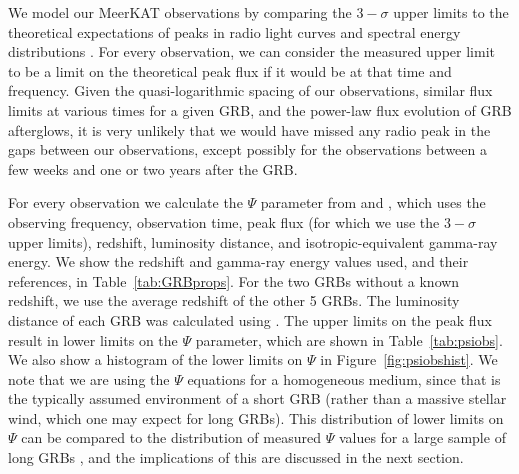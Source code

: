 \documentclass[12pt]{article}
\begin{document}
We model our MeerKAT observations by comparing the $3-\sigma$ upper limits to the theoretical expectations of peaks in radio light curves and spectral energy distributions \citep{2017MNRAS.472.3161B,2023MNRAS.518.1522D}. For every observation, we can consider the measured upper limit to be a limit on the theoretical peak flux if it would be at that time and frequency. Given the quasi-logarithmic spacing of our observations, similar flux limits at various times for a given GRB, and the power-law flux evolution of GRB afterglows, it is very unlikely that we would have missed any radio peak in the gaps between our observations, except possibly for the observations between a few weeks and one or two years after the GRB. 

For every observation we calculate the $\Psi$ parameter from \citet{2017MNRAS.472.3161B} and \citet{2023MNRAS.518.1522D}, which uses the observing frequency, observation time, peak flux (for which we use the $3-\sigma$ upper limits), redshift, luminosity distance, and isotropic-equivalent gamma-ray energy. We show the redshift and gamma-ray energy values used, and their references, in Table~\ref{tab:GRBprops}. For the two GRBs without a known redshift, we use the average redshift of the other 5 GRBs. The luminosity distance of each GRB was calculated using \citet{2006PASP..118.1711W}. The upper limits on the peak flux result in lower limits on the $\Psi$ parameter, which are shown in Table~\ref{tab:psiobs}. We also show a histogram of the lower limits on $\Psi$ in Figure~\ref{fig:psiobshist}. We note that we are using the $\Psi$ equations for a homogeneous medium, since that is the typically assumed environment of a short GRB (rather than a massive stellar wind, which one may expect for long GRBs). This distribution of lower limits on $\Psi$ can be compared to the distribution of measured $\Psi$ values for a large sample of long GRBs \citep{2023MNRAS.518.1522D}, and the implications of this are discussed in the next section.
\end{document}
